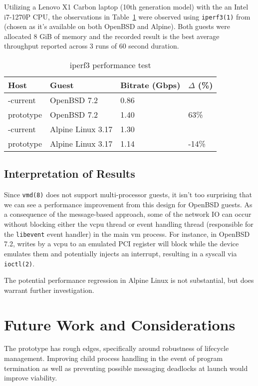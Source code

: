 \documentclass[conference]{IEEEtran}
\begin{document}
Utilizing a Lenovo X1 Carbon laptop (10th generation model) with the
an Intel i7-1270P CPU, the observations in Table~\ref{perf} were
observed using \texttt{iperf3(1)} from (chosen as it's available on
both OpenBSD and Alpine). Both guests were allocated 8 GiB of memory
and the recorded result is the best average throughput reported across
3 runs of 60 second duration.

\vspace{2mm}
\begin{table}
\begin{center}
\caption{\label{perf}iperf3 performance test}
\begin{tabular}{| l | l | p{1cm} | l |}
  \hline
  Host & Guest & Bitrate (Gbps) & $\Delta$ (\%) \\ \hline
  -current & OpenBSD 7.2 & 0.86 &  \\ \hline
  prototype & OpenBSD 7.2 & 1.40 & 63\% \\ \hline
  -current & Alpine Linux 3.17 & 1.30 &   \\ \hline
  prototype & Alpine Linux 3.17 & 1.14 & -14\%  \\ \hline
\end{tabular}
\end{center}
\end{table}
\vspace{2mm}

\subsection{Interpretation of Results}
Since \texttt{vmd(8)} does not support multi-processor guests, it
isn't too surprising that we can see a performance improvement from
this design for OpenBSD guests. As a consequence of the message-based
approach, some of the network IO can occur without blocking either the
vcpu thread or event handling thread (responsible for the
\texttt{libevent} event handler) in the main vm process. For instance,
in OpenBSD 7.2, writes by a vcpu to an emulated PCI register will
block while the device emulates them and potentially injects an
interrupt, resulting in a syscall via \texttt{ioctl(2)}.

The potential performance regression in Alpine Linux is not
substantial, but does warrant further investigation.


\vspace{5mm}
\section{Future Work and Considerations}
The prototype has rough edges, specifically around robustness of
lifecycle management. Improving child process handling in the event of
program termination as well as preventing possible messaging deadlocks
at launch would improve viability.
\end{document}
